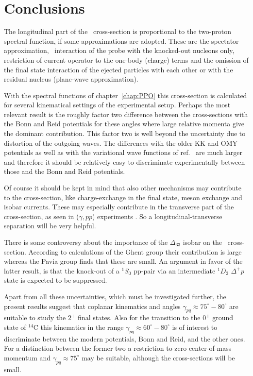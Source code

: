 \section{Conclusions\label{sec:CROSSconclusions}}
The longitudinal part of the \eepp\ cross-section is proportional to the 
two-proton spectral function, if some approximations are adopted. These are 
the spectator approximation, \ie\ interaction of the probe with the 
knocked-out nucleons only\cite{GP91}, restriction of current operator to the 
one-body (charge) terms and the omission of the final state interaction of the 
ejected particles with each other or with the residual nucleus (plane-wave 
approximation).

With the spectral functions of chapter~\ref{chap:PPO} this cross-section is 
calculated for several kinematical settings of the experimental setup. 
Perhaps the most relevant result is the roughly factor two difference between 
the cross-sections with the Bonn and Reid potentials for these angles where 
large relative momenta give the dominant contribution. This factor two is well 
beyond the uncertainty due to distortion of the outgoing waves\cite{GP91}. The 
differences with the older KK and OMY potentials as well as with the 
variational wave functions of ref.~\cite{PWP92} are much larger and therefore 
it should be relatively easy to discriminate experimentally between those and 
the Bonn and Reid potentials.

Of course it should be kept in mind that also other mechanisms may contribute 
to the cross-section, like charge-exchange in the final state, meson exchange 
and isobar currents. These may especially contribute in the transverse part of 
the cross-section, as seen in ($\gamma,pp$) experiments \cite{Ry94}. 
So a longitudinal-transverse separation will be very helpful.

There is some controversy about the importance of the $\Delta_{33}$ isobar on 
the \eepp\ cross-section. According to calculations of the Ghent 
group\cite{Ry94} their contribution is large whereas the Pavia 
group\cite{GP91,GP92,GP94} finds that these are small. An argument in favor of 
the latter result, is that the knock-out of a $^1S_0$ pp-pair via an 
intermediate $^1D_2$ $\Delta^+p$ state is expected to be 
suppressed\cite{BlokPrive}.

Apart from all these uncertainties, which must be investigated further, 
the present results suggest that coplanar kinematics and angles 
$\gamma_{pq} \approx 75^\circ - 80^\circ$ 
are suitable to study the $2^+$ final states. Also for the transition to the 
$0^+$ ground state of $^{14}$C this kinematics in the range
$\gamma_{pq} \approx 60^\circ - 80^\circ$ 
is of interest to discriminate between the modern potentials, Bonn and Reid, 
and the other ones. For  a distinction between the former two a restriction to 
zero center-of-mass momentum and 
$\gamma_{pq} \approx 75^\circ$ 
 may be suitable, although the cross-sections will be small.
